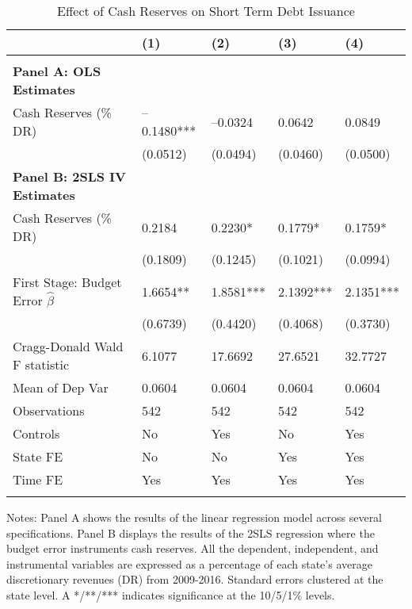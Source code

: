 \documentclass{article}
\begin{document}
\begin{table}[tbp] \centering
{}

\caption{Effect of Cash Reserves on Short Term Debt Issuance}
\label{tab:Regression_StDebt}
\begin{tabularx}{\linewidth}{lCCCC}

\toprule
&{(1)}&{(2)}&{(3)}&{(4)} \tabularnewline \midrule
{}&{}&{}&{}&{} \tabularnewline
\midrule \addlinespace[\belowrulesep]
\textbf{Panel A: OLS Estimates}&&&& \tabularnewline
\midrule Cash Reserves (\% DR)&--0.1480***&--0.0324&0.0642&0.0849 \tabularnewline
&(0.0512)&(0.0494)&(0.0460)&(0.0500) \tabularnewline
\textbf{Panel B: 2SLS IV Estimates}&&&& \tabularnewline
\midrule Cash Reserves (\% DR)&0.2184&0.2230*&0.1779*&0.1759* \tabularnewline
&(0.1809)&(0.1245)&(0.1021)&(0.0994) \tabularnewline
First Stage: Budget Error $\hat{\beta}$&1.6654**&1.8581***&2.1392***&2.1351*** \tabularnewline
&(0.6739)&(0.4420)&(0.4068)&(0.3730) \tabularnewline
Cragg-Donald Wald F statistic&6.1077&17.6692&27.6521&32.7727 \tabularnewline
\midrule Mean of Dep Var&0.0604&0.0604&0.0604&0.0604 \tabularnewline
Observations&542&542&542&542 \tabularnewline
Controls&No&Yes&No&Yes \tabularnewline
State FE&No&No&Yes&Yes \tabularnewline
Time FE&Yes&Yes&Yes&Yes \tabularnewline
\bottomrule \addlinespace[\belowrulesep]

\end{tabularx}
\begin{flushleft}
\footnotesize Notes: Panel A shows the results of the linear regression model across several specifications. Panel B displays the results of the 2SLS regression where the budget error instruments cash reserves. All the dependent, independent, and instrumental variables are expressed as a percentage of each state's average discretionary revenues (DR) from 2009-2016. Standard errors clustered at the state level. A */**/*** indicates significance at the 10/5/1\% levels.
\end{flushleft}
\end{table}
\end{document}
